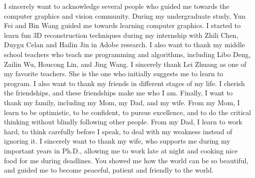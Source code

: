 I sincerely want to acknowledge several people who guided me towards the computer graphics and vision community. During my undergraduate study, Yun Fei and Bin Wang guided me towards learning computer graphics. I started to learn fun 3D reconstruction techniques during my internship with Zhili Chen, Duygu Celan and Hailin Jin in Adobe research.
%
I also want to thank my middle school teachers who teach me programming and algorithms, including Libo Deng, Zailin Wu, Houcong Lin, and Jing Wang.
I sincerely thank Lei Zhuang as one of my favorite teachers. She is the one who initially suggests me to learn to program.
I also want to thank my friends in different stages of my life. I cherish the friendships, and these friendships make me who I am.
%
Finally, I want to thank my family, including my Mom, my Dad, and my wife. From my Mom, I learn to be optimistic, to be confident, to pursue excellence, and to do the critical thinking without blindly following other people.
From my Dad, I learn to work hard, to think carefully before I speak, to deal with my weakness instead of ignoring it.
I sincerely want to thank my wife, who supports me during my important years in Ph.D., allowing me to work late at night and cooking nice food for me during deadlines. You showed me how the world can be so beautiful, and guided me to become peaceful, patient and friendly to the world.